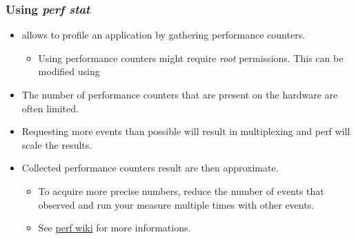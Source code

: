\begin{frame}[fragile]
  \frametitle{Using {\em perf stat}}
  \begin{itemize}
    \item {} allows to profile an application by gathering
          performance counters.
    \begin{itemize}
      \item Using performance counters might require {\em root} permissions. This can be
            modified using 
    \end{itemize}
    \item The number of performance counters that are present on the hardware are often
          limited.
    \item Requesting more events than possible will result in multiplexing and
          perf will scale the results.
    \item Collected performance counters result are then approximate.
    \begin{itemize}
      \item To acquire more precise numbers, reduce the number of events that
            observed and run your measure multiple times with other events.
      \item See \href{https://perf.wiki.kernel.org/index.php/Tutorial#multiple_events}{perf wiki}
            for more informations.
    \end{itemize}
  \end{itemize}
\end{frame}

